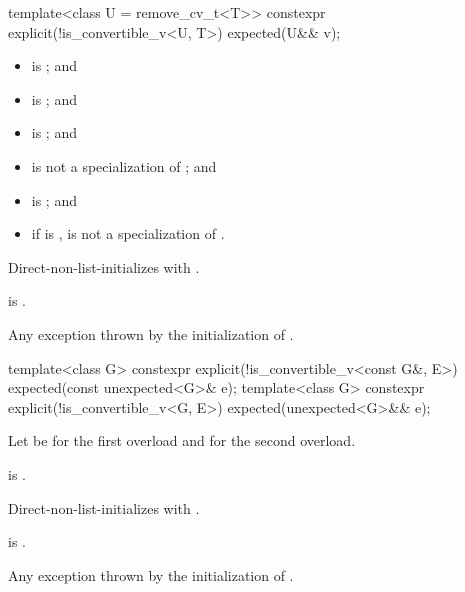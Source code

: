 %
\begin{itemdecl}
template<class U = remove_cv_t<T>>
  constexpr explicit(!is_convertible_v<U, T>) expected(U&& v);
\end{itemdecl}

\begin{itemdescr}
\pnum
\constraints
\begin{itemize}
\item
{} is ; and
\item
{} is ; and
\item
{} is ; and
\item
{} is not a specialization of ; and
\item
{} is ; and
\item
if  is \cv{} ,
 is not a specialization of .
\end{itemize}

\pnum
\effects
Direct-non-list-initializes  with .

\pnum
\ensures
{} is .

\pnum
\throws
Any exception thrown by the initialization of .
\end{itemdescr}

%
\begin{itemdecl}
template<class G>
  constexpr explicit(!is_convertible_v<const G&, E>) expected(const unexpected<G>& e);
template<class G>
  constexpr explicit(!is_convertible_v<G, E>) expected(unexpected<G>&& e);
\end{itemdecl}

\begin{itemdescr}
\pnum
Let  be  for the first overload and
 for the second overload.

\pnum
\constraints
{} is .

\pnum
\effects
Direct-non-list-initializes  with .

\pnum
\ensures
{} is .

\pnum
\throws
Any exception thrown by the initialization of .
\end{itemdescr}

